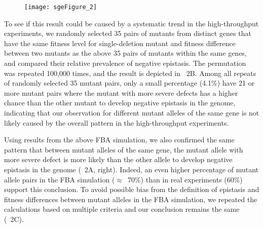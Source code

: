\label{fig:expVerifyYeast1}

\begin{figure}[H]
\centering
\texttt{[image: sgeFigure\_2]}
\end{figure}

To see if this result could be caused by a systematic trend in the
high-throughput experiments, we randomly selected 35 pairs of mutants
from distinct genes that have the same fitness level for
single-deletion mutant and fitness difference between two mutants as
the above 35 pairs of mutants within the same genes, and compared
their relative prevalence of negative epistasis. The permutation was
repeated 100,000 times, and the result is depicted in \Fig~2B. Among
all repeats of randomly selected 35 mutant pairs, only a small
percentage (4.1\%) have 21 or more mutant pairs where the mutant with
more severe defects has a higher chance than the other mutant to
develop negative epistasis in the genome, indicating that our
observation for different mutant alleles of the same gene is not
likely caused by the overall pattern in the high-throughput
experiments.

Using results from the above FBA simulation, we also confirmed the
same pattern that between mutant alleles of the same gene, the mutant
allele with more severe defect is more likely than the other allele to
develop negative epistasis in the genome (\Fig~2A, right). Indeed, an
even higher percentage of mutant allele pairs in the FBA simulation
($\approx$~70\%) than in real experiments (60\%) support this
conclusion. To avoid possible bias from the definition of epistasis
and fitness differences between mutant alleles in the FBA simulation,
we repeated the calculations based on multiple criteria and our
conclusion remains the same (\Fig~2C).

